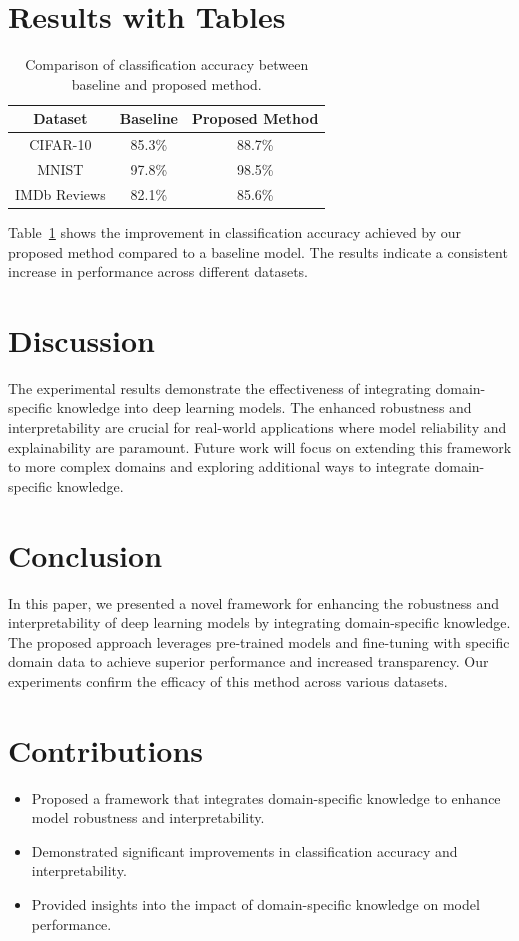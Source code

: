 \documentclass{article}
\begin{document}
\section{Results with Tables}
\begin{table}[ht]
\centering
\begin{tabular}{|c|c|c|}
\hline
\textbf{Dataset} & \textbf{Baseline} & \textbf{Proposed Method} \\
\hline
CIFAR-10 & 85.3\% & 88.7\% \\
MNIST & 97.8\% & 98.5\% \\
IMDb Reviews & 82.1\% & 85.6\% \\
\hline
\end{tabular}
\caption{Comparison of classification accuracy between baseline and proposed method.}
\label{tab:results}
\end{table}

Table~\ref{tab:results} shows the improvement in classification accuracy achieved by our proposed method compared to a baseline model. The results indicate a consistent increase in performance across different datasets.

\section{Discussion}
The experimental results demonstrate the effectiveness of integrating domain-specific knowledge into deep learning models. The enhanced robustness and interpretability are crucial for real-world applications where model reliability and explainability are paramount. Future work will focus on extending this framework to more complex domains and exploring additional ways to integrate domain-specific knowledge.

\section{Conclusion}
In this paper, we presented a novel framework for enhancing the robustness and interpretability of deep learning models by integrating domain-specific knowledge. The proposed approach leverages pre-trained models and fine-tuning with specific domain data to achieve superior performance and increased transparency. Our experiments confirm the efficacy of this method across various datasets.

\section{Contributions}
\begin{itemize}
\item Proposed a framework that integrates domain-specific knowledge to enhance model robustness and interpretability.
\item Demonstrated significant improvements in classification accuracy and interpretability.
\item Provided insights into the impact of domain-specific knowledge on model performance.
\end{itemize}



\end{document}
